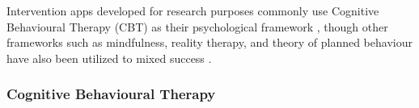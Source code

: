 \documentclass[12pt]{article}
\begin{document}

Intervention apps developed for research purposes commonly use Cognitive Behavioural Therapy (CBT) as their 
psychological framework
\autocite{RefWorks:RefID:87-weisel2019standalone,RefWorks:RefID:75-oliveira2021effectiveness}, though other 
frameworks such as mindfulness, reality therapy, and theory of planned behaviour have also been utilized to 
mixed success 
\autocite{RefWorks:RefID:135-gajecki2014mobile, RefWorks:RefID:136-witkiewitz2014development, RefWorks:RefID:106-lu2025interventions}.




\subsubsection{Cognitive Behavioural Therapy}
\end{document}
